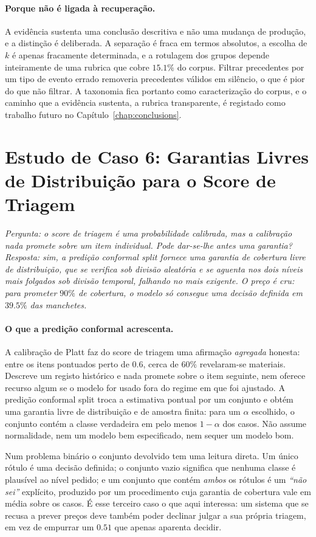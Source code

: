 \paragraph{Porque não é ligada à recuperação.} A evidência sustenta uma conclusão descritiva e não
uma mudança de produção, e a distinção é deliberada. A separação é fraca em termos absolutos, a
escolha de $k$ é apenas fracamente determinada, e a rotulagem dos grupos depende inteiramente de uma
rubrica que cobre $15.1\%$ do corpus. Filtrar precedentes por um tipo de evento errado removeria
precedentes válidos em silêncio, o que é pior do que não filtrar. A taxonomia fica portanto como
caracterização do corpus, e o caminho que a evidência sustenta, a rubrica transparente, é registado
como trabalho futuro no Capítulo~\ref{chap:conclusions}.

\section{Estudo de Caso 6: Garantias Livres de Distribuição para o Score de Triagem}
\label{sec:cs_conformal}

\emph{Pergunta: o score de triagem é uma probabilidade calibrada, mas a calibração nada promete sobre
um item individual. Pode dar-se-lhe antes uma garantia? Resposta: sim, a predição conformal split
fornece uma garantia de cobertura livre de distribuição, que se verifica sob divisão aleatória e se
aguenta nos dois níveis mais folgados sob divisão temporal, falhando no mais exigente. O preço é
cru: para prometer $90\%$ de cobertura, o modelo só consegue uma decisão definida em $39.5\%$ das
manchetes.}

\paragraph{O que a predição conformal acrescenta.} A calibração de Platt faz do score de triagem uma
afirmação \emph{agregada} honesta: entre os itens pontuados perto de $0.6$, cerca de $60\%$ revelaram-se
materiais. Descreve um registo histórico e nada promete sobre o item seguinte, nem oferece recurso
algum se o modelo for usado fora do regime em que foi ajustado. A predição conformal split troca a
estimativa pontual por um conjunto e obtém uma garantia livre de distribuição e de amostra finita:
para um $\alpha$ escolhido, o conjunto contém a classe verdadeira em pelo menos $1-\alpha$ dos casos.
Não assume normalidade, nem um modelo bem especificado, nem sequer um modelo bom.

Num problema binário o conjunto devolvido tem uma leitura direta. Um único rótulo é uma decisão
definida; o conjunto vazio significa que nenhuma classe é plausível ao nível pedido; e um conjunto
que contém \emph{ambos} os rótulos é um \emph{``não sei''} explícito, produzido por um procedimento
cuja garantia de cobertura vale em média sobre os casos. É
esse terceiro caso o que aqui interessa: um sistema que se recusa a prever preços deve também poder
declinar julgar a sua própria triagem, em vez de empurrar um $0.51$ que apenas aparenta decidir.

